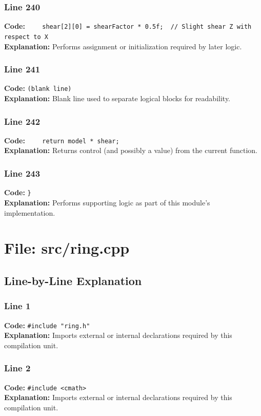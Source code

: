 \documentclass[11pt,a4paper]{article}
\begin{document}
\subsubsection*{Line 240}
\textbf{Code:} \verb|    shear[2][0] = shearFactor * 0.5f;  // Slight shear Z with respect to X|\\
\textbf{Explanation:} Performs assignment or initialization required by later logic.

\subsubsection*{Line 241}
\textbf{Code:} \texttt{(blank line)}\\
\textbf{Explanation:} Blank line used to separate logical blocks for readability.

\subsubsection*{Line 242}
\textbf{Code:} \verb|    return model * shear;|\\
\textbf{Explanation:} Returns control (and possibly a value) from the current function.

\subsubsection*{Line 243}
\textbf{Code:} \verb|}|\\
\textbf{Explanation:} Performs supporting logic as part of this module's implementation.

\newpage
\section{File: src/ring.cpp}
\subsection{Line-by-Line Explanation}
\subsubsection*{Line 1}
\textbf{Code:} \verb|#include "ring.h"|\\
\textbf{Explanation:} Imports external or internal declarations required by this compilation unit.

\subsubsection*{Line 2}
\textbf{Code:} \verb|#include <cmath>|\\
\textbf{Explanation:} Imports external or internal declarations required by this compilation unit.
\end{document}
